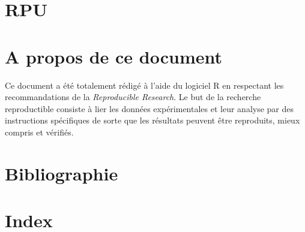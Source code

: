 \documentclass[12pt,english,french,twoside]{report}\usepackage[]{graphicx}\usepackage[]{color}
\begin{document}
\chapter{RPU}
\chapter{A propos de ce document}


Ce document a été totalement rédigé à l'aide du logiciel R \cite{5} en respectant les recommandations de la \emph{Reproducible Research}. Le but de la recherche reproductible consiste à lier les données expérimentales et leur analyse par des instructions spécifiques de sorte que les résultats peuvent être reproduits, mieux compris et vérifiés.

\chapter{Bibliographie}

\chapter{Index}
\printindex
\end{document}
